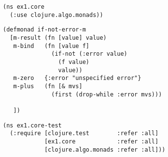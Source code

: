\documentclass[11pt]{article}
\begin{document}
\begin{figure}[H]
\label{main-namespace}
\begin{verbatim}
(ns ex1.core
  (:use clojure.algo.monads))
\end{verbatim}
\end{figure}

\begin{figure}[H]
\label{main-monad}
\begin{verbatim}
(defmonad if-not-error-m
  [m-result (fn [value] value)
   m-bind   (fn [value f]
              (if-not (:error value)
                (f value) 
                value))
   m-zero   {:error "unspecified error"}
   m-plus   (fn [& mvs]
              (first (drop-while :error mvs)))

   ])
\end{verbatim}
\end{figure}

\begin{figure}[H]
\label{main-test-namespace}
\begin{verbatim}
(ns ex1.core-test
  (:require [clojure.test        :refer :all]
            [ex1.core            :refer :all]
            [clojure.algo.monads :refer :all]))
\end{verbatim}
\end{figure}
\end{document}
